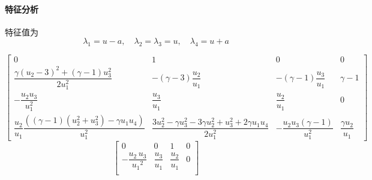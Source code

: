 \documentclass{book}
\begin{document}
\begin{example}
\begin{example}{}{}
\begin{example}
\begin{example}
\begin{example}
\begin{example}
\begin{example}{}{}
\paragraph{特征分析}
特征值为
\begin{equation}
    \lambda_{1}=u-a, \quad \lambda_{2}=\lambda_{3}=u, \quad \lambda_{4}=u+a
\end{equation}

\begin{equation}
    \begin{bmatrix}
        0                                                                                                & 1                                                                                                   & 0                                         & 0                           \\
        \dfrac{\gamma (u_{2}-3)^{2}+(\gamma-1) u_{3}^{2}}{2 u_{1}^{2}}                                   & -(\gamma-3)\dfrac{u_{2}}{u_{1}}                                                                     & -(\gamma-1)\dfrac{u_{3}}{u_{1}}           & \gamma-1                    \\
        -\dfrac{u_{2} u_{3}}{u_{1}^{2}}                                                                  & \dfrac{u_{3}}{u_{1}}                                                                                & \dfrac{u_{2}}{u_{1}}                      & 0                           \\
        \dfrac{u_{2}}{u_1}\dfrac{\left((\gamma-1)(u_{2}^{2}+u_3^2)-\gamma u_{1} u_{4}\right)}{u_{1}^{2}} & \dfrac{3 u_{2}^{2}-\gamma u_{3}^{2}-3 \gamma u_{2}^{2}+u_{3}^{2}+2 \gamma u_{1} u_{4}}{2 u_{1}^{2}} & -\dfrac{u_{2} u_{3}(\gamma-1)}{u_{1}^{2}} & \dfrac{\gamma u_{2}}{u_{1}}
    \end{bmatrix}
\end{equation}
\begin{equation}
    \begin{bmatrix}
        0                                                                                             & 0                                                        & 1                                                                                       & 0                           \\
        -\dfrac{u_2 \,u_3 }{{u_1 }^2 }                                                                & \dfrac{u_3 }{u_1 }                                       & \dfrac{u_2 }{u_1 }                                                                      & 0                           \\

\end{bmatrix}
\end{equation}
\end{example}
\end{example}
\end{example}
\end{example}
\end{example}
\end{example}
\end{example}
\end{document}
